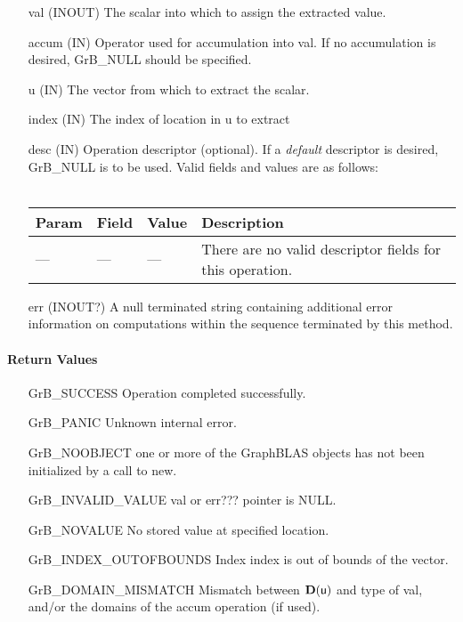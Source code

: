 \begin{itemize}[leftmargin=1in]
    \item[{\sf val}]   ({\sf INOUT}) The scalar into which to assign the extracted value.
    \item[{\sf accum}] ({\sf IN}) Operator used for accumulation into {\sf val}. If no accumulation is desired,
                        {\sf GrB\_NULL} should be specified.
    \item[{\sf u}]     ({\sf IN})  The vector from which to extract the scalar.
    \item[{\sf index}] ({\sf IN}) The index of location in {\sf u} to extract

    \item[{\sf desc}]  ({\sf IN}) Operation descriptor (optional). If a
    \emph{default} descriptor is desired, {\sf GrB\_NULL} is to be
    used.  Valid fields and values are as follows: \\ ~ \\
    \begin{tabular}{lllp{2.5in}}
    Param & Field  & Value & Description \\
    \hline
    {\sf ---} & {\sf ---} & {\sf ---} & There are no valid descriptor fields for this operation. \\
    \end{tabular}
    \item[{\sf err}]   ({\sf INOUT?})  A null terminated string containing additional error
                         information on computations within the sequence 
                         terminated by this method. 

\end{itemize}

\paragraph{Return Values}

\begin{itemize}[leftmargin=2.1in]
\item[{\sf GrB\_SUCCESS}]          Operation completed successfully.
\item[{\sf GrB\_PANIC}]            Unknown internal error.
\item[{\sf GrB\_NOOBJECT}]   one or more of the GraphBLAS objects has
                             not been initialized by a call to {\sf new}.
\item[{\sf GrB\_INVALID\_VALUE}]    {\sf val} or {\sf err???} pointer is {\sf NULL}.
\item[{\sf GrB\_NOVALUE}]        No stored value at specified location.
\item[{\sf GrB\_INDEX\_OUTOFBOUNDS}]  Index {\sf index} is out of 
                                      bounds of the vector. 
\item[{\sf GrB\_DOMAIN\_MISMATCH}]    Mismatch between $\bold{D}(\sf u)$ and type of {\sf val},
                                      and/or the domains of the 
                                      {\sf accum} operation (if used).
\end{itemize}

